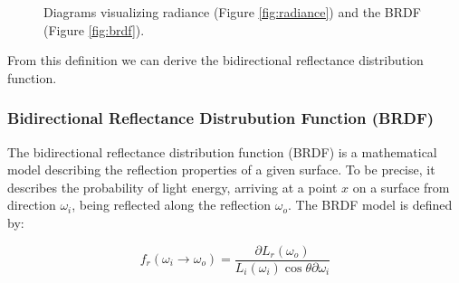 \begin{figure}[h]
	\centering
	\hfill
	\caption{Diagrams visualizing radiance (Figure \ref{fig:radiance}) and the BRDF (Figure \ref{fig:brdf}).}
\end{figure}

From this definition we can derive the bidirectional reflectance distribution function.

\subsubsection{Bidirectional Reflectance Distrubution Function (BRDF)}
The bidirectional reflectance distribution function (BRDF) is a mathematical model describing the reflection properties of a given surface. To be precise, it describes the probability of light energy, arriving at a point $x$ on a surface from direction $\omega_{i}$, being reflected along the reflection $\omega_{o}$. 
The BRDF model is defined by:

\begin{equation} \label{eq:brdf}
f_{r}(\omega_{i} \rightarrow \omega_{o}) = \frac{\partial L_{r}(\omega_{o})}{L_{i}(\omega_{i})\cos\theta\partial\omega_{i}}
\end{equation}

